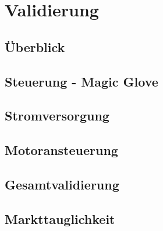 \chapter{Validierung} 

\section{Überblick}
\section{Steuerung - Magic Glove}
\section{Stromversorgung}
\section{Motoransteuerung}
\section{Gesamtvalidierung}
\section{Markttauglichkeit}